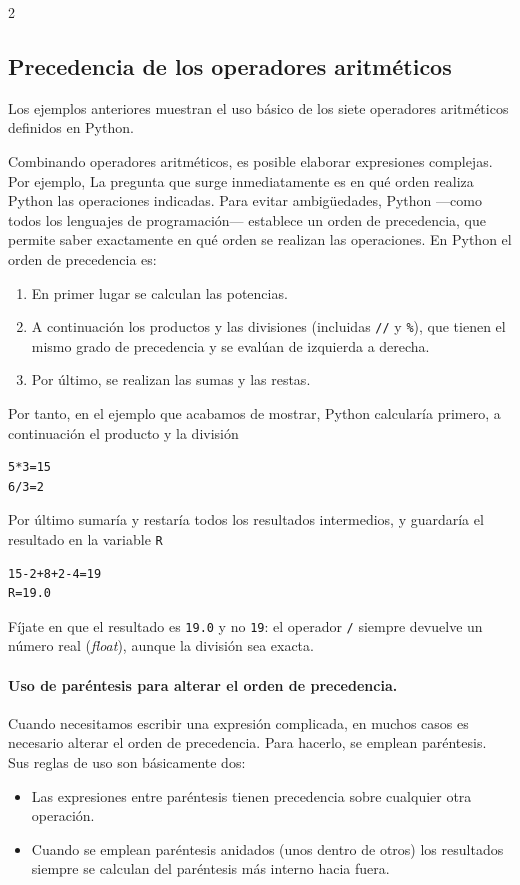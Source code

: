 \begin{paracol}{2}
\subsection{Precedencia de los operadores aritméticos}
Los ejemplos anteriores muestran el uso básico de los siete operadores aritméticos definidos en Python. 
 
Combinando operadores aritméticos, es posible elaborar expresiones complejas. Por ejemplo,
La pregunta que surge inmediatamente es en qué orden realiza Python las operaciones indicadas. Para evitar ambigüedades, Python ---como todos los lenguajes de programación--- establece un orden de precedencia, que permite saber exactamente en qué orden se realizan las operaciones. En Python el orden de precedencia es:
\begin{enumerate}
\item En primer lugar se calculan las potencias.
\item A continuación los productos y las divisiones (incluidas \texttt{//} y \texttt{\%}), que tienen el mismo grado de precedencia y se evalúan de izquierda a derecha.
\item Por último, se realizan las sumas y las restas. 
\end{enumerate} 

Por tanto, en el ejemplo que acabamos de mostrar, Python calcularía primero,
a continuación el producto y la división
\begin{verbatim}
5*3=15
6/3=2
\end{verbatim}
Por último sumaría y restaría todos los resultados intermedios, y guardaría el resultado en la variable \texttt{R}
\begin{verbatim}
15-2+8+2-4=19
R=19.0
\end{verbatim}
Fíjate en que el resultado es \texttt{19.0} y no \texttt{19}: el operador \texttt{/} siempre devuelve un número real (\emph{float}), aunque la división sea exacta.

\paragraph{Uso de paréntesis para alterar el orden de precedencia.}
Cuando necesitamos escribir una expresión complicada, en muchos casos es necesario alterar el orden de precedencia. Para hacerlo, se emplean paréntesis. Sus reglas de uso son básicamente dos:
\begin{itemize}
\item Las expresiones entre paréntesis tienen precedencia sobre cualquier otra operación.
\item Cuando se emplean paréntesis anidados (unos dentro de otros) los resultados siempre se calculan del paréntesis más interno hacia fuera.
\end{itemize}


\end{paracol}
